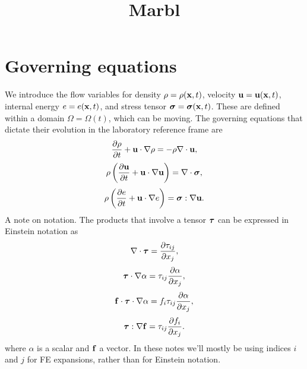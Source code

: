 \documentclass[11pt]{article}
\title{Marbl}
\begin{document}
\maketitle

\section{Governing equations}
We introduce the flow variables for density $\rho = \rho(\mathbf{x},t)$, velocity $\mathbf{u} = \mathbf{u}(\mathbf{x},t)$, internal energy $e = e(\mathbf{x},t)$, and stress tensor $\bm \sigma = \bm \sigma(\mathbf{x},t)$. These are defined within a domain $\Omega = \Omega(t)$, which can be moving. The governing equations that dictate their evolution in the laboratory reference frame are
\begin{equation}
    \frac{\partial \rho}{\partial t} + \mathbf{u} \cdot \nabla \rho = -\rho \nabla \cdot \mathbf{u},
\end{equation}
\begin{equation}
    \rho \left ( \frac{\partial \mathbf{u}}{\partial t} + \mathbf{u} \cdot \nabla \mathbf{u} \right ) = \nabla \cdot \bm \sigma,
\end{equation}
\begin{equation}
    \rho \left ( \frac{\partial e}{\partial t} + \mathbf{u} \cdot \nabla e \right ) = \bm \sigma : \nabla \mathbf{u}.
\end{equation}
A note on notation. The products that involve a tensor $\bm \tau$ can be expressed in Einstein notation as
\begin{equation}
    \nabla \cdot \bm \tau = \frac{\partial \tau_{ij}}{\partial x_j},
\end{equation}
\begin{equation}
    \bm \tau \cdot \nabla \alpha = \tau_{ij} \frac{\partial \alpha}{\partial x_j},
\end{equation}
\begin{equation}
    \mathbf{f} \cdot \bm \tau \cdot \nabla \alpha = f_i \tau_{ij} \frac{\partial \alpha}{\partial x_j},
\end{equation}
\begin{equation}
    \bm \tau : \nabla \mathbf{f} = \tau_{ij} \frac{\partial f_i}{\partial x_j}.
\end{equation}
where $\alpha$ is a scalar and $\mathbf{f}$ a vector. In these notes we'll mostly be using indices $i$ and $j$ for FE expansions, rather than for Einstein notation.
\end{document}
